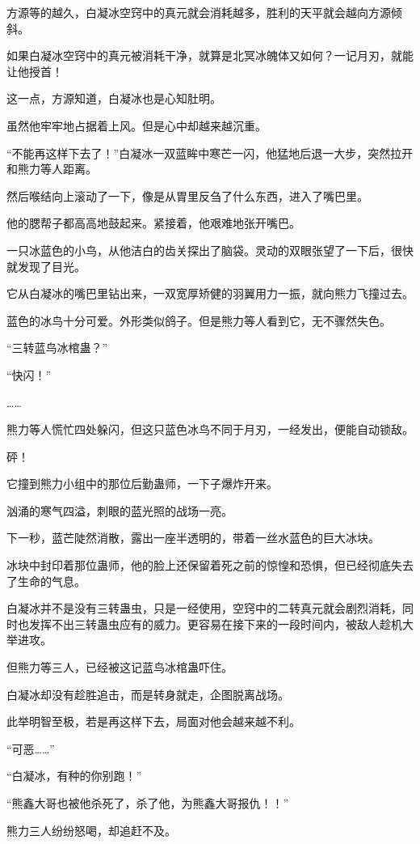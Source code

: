 \begin{this_body}
方源等的越久，白凝冰空窍中的真元就会消耗越多，胜利的天平就会越向方源倾斜。

如果白凝冰空窍中的真元被消耗干净，就算是北冥冰魄体又如何？一记月刃，就能让他授首！

这一点，方源知道，白凝冰也是心知肚明。

虽然他牢牢地占据着上风。但是心中却越来越沉重。

“不能再这样下去了！”白凝冰一双蓝眸中寒芒一闪，他猛地后退一大步，突然拉开和熊力等人距离。

然后喉结向上滚动了一下，像是从胃里反刍了什么东西，进入了嘴巴里。

他的腮帮子都高高地鼓起来。紧接着，他艰难地张开嘴巴。

一只冰蓝色的小鸟，从他洁白的齿关探出了脑袋。灵动的双眼张望了一下后，很快就发现了目光。

它从白凝冰的嘴巴里钻出来，一双宽厚矫健的羽翼用力一振，就向熊力飞撞过去。

蓝色的冰鸟十分可爱。外形类似鸽子。但是熊力等人看到它，无不骤然失色。

“三转蓝鸟冰棺蛊？”

“快闪！”

……

熊力等人慌忙四处躲闪，但这只蓝色冰鸟不同于月刃，一经发出，便能自动锁敌。

砰！

它撞到熊力小组中的那位后勤蛊师，一下子爆炸开来。

汹涌的寒气四溢，刺眼的蓝光照的战场一亮。

下一秒，蓝芒陡然消散，露出一座半透明的，带着一丝水蓝色的巨大冰块。

冰块中封印着那位蛊师，他的脸上还保留着死之前的惊惶和恐惧，但已经彻底失去了生命的气息。

白凝冰并不是没有三转蛊虫，只是一经使用，空窍中的二转真元就会剧烈消耗，同时也发挥不出三转蛊虫应有的威力。更容易在接下来的一段时间内，被敌人趁机大举进攻。

但熊力等三人，已经被这记蓝鸟冰棺蛊吓住。

白凝冰却没有趁胜追击，而是转身就走，企图脱离战场。

此举明智至极，若是再这样下去，局面对他会越来越不利。

“可恶……”

“白凝冰，有种的你别跑！”

“熊鑫大哥也被他杀死了，杀了他，为熊鑫大哥报仇！！”

熊力三人纷纷怒喝，却追赶不及。


\end{this_body}
